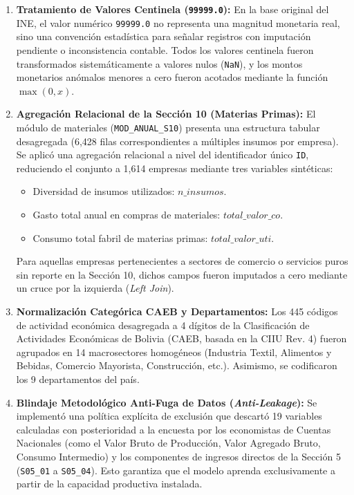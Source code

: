 \begin{enumerate}
    \item \textbf{Tratamiento de Valores Centinela (\texttt{99999.0}):}
    En la base original del INE, el valor numérico \texttt{99999.0} no representa una magnitud monetaria real, sino una convención estadística para señalar registros con imputación pendiente o inconsistencia contable. Todos los valores centinela fueron transformados sistemáticamente a valores nulos (\texttt{NaN}), y los montos monetarios anómalos menores a cero fueron acotados mediante la función $\max(0, x)$.
    
    \item \textbf{Agregación Relacional de la Sección 10 (Materias Primas):}
    El módulo de materiales (\texttt{MOD\_ANUAL\_S10}) presenta una estructura tabular desagregada (6,428 filas correspondientes a múltiples insumos por empresa). Se aplicó una agregación relacional a nivel del identificador único \texttt{ID}, reduciendo el conjunto a 1,614 empresas mediante tres variables sintéticas:
    \begin{itemize}
        \item Diversidad de insumos utilizados: $n\_insumos$.
        \item Gasto total anual en compras de materiales: $total\_valor\_co$.
        \item Consumo total fabril de materias primas: $total\_valor\_uti$.
    \end{itemize}
    Para aquellas empresas pertenecientes a sectores de comercio o servicios puros sin reporte en la Sección 10, dichos campos fueron imputados a cero mediante un cruce por la izquierda (\textit{Left Join}).

    \item \textbf{Normalización Categórica CAEB y Departamentos:}
    Los 445 códigos de actividad económica desagregada a 4 dígitos de la Clasificación de Actividades Económicas de Bolivia (CAEB, basada en la CIIU Rev. 4) fueron agrupados en 14 macrosectores homogéneos (Industria Textil, Alimentos y Bebidas, Comercio Mayorista, Construcción, etc.). Asimismo, se codificaron los 9 departamentos del país.

    \item \textbf{Blindaje Metodológico Anti-Fuga de Datos (\textit{Anti-Leakage}):}
    Se implementó una política explícita de exclusión que descartó 19 variables calculadas con posterioridad a la encuesta por los economistas de Cuentas Nacionales (como el Valor Bruto de Producción, Valor Agregado Bruto, Consumo Intermedio) y los componentes de ingresos directos de la Sección 5 (\texttt{S05\_01} a \texttt{S05\_04}). Esto garantiza que el modelo aprenda exclusivamente a partir de la capacidad productiva instalada.


\end{enumerate}
